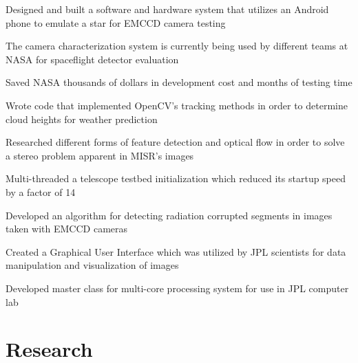 \documentclass[letterpaper]{deedy-resume} %
\begin{document}
\begin{minipage}[t]{0.66\textwidth}
\begin{tightitemize}
	\item 	Designed and built a software and hardware system that utilizes an Android phone to emulate a star for EMCCD camera testing
	\item 	The camera characterization system is currently being used by different teams at NASA for spaceflight detector evaluation 
	\item Saved NASA thousands of dollars in development cost and months of testing time 
\end{tightitemize}
\begin{tightitemize}
	\item  	Wrote code that implemented OpenCV's tracking methods in order to determine cloud heights for weather prediction 
	\item 	Researched different forms of feature detection and optical flow in order to solve a stereo problem apparent in MISR’s images 
\end{tightitemize}
\begin{tightitemize}
	\item 	Multi-threaded a telescope testbed initialization which reduced its startup speed by a factor of 14
	\item 	Developed an algorithm for detecting radiation corrupted segments in images taken with EMCCD cameras 
\end{tightitemize}
\begin{tightitemize}
	\item 	Created a Graphical User Interface which was utilized by JPL scientists for data manipulation and visualization of images 
	\item 	Developed master class for multi-core processing system for use in JPL computer lab 
\end{tightitemize}

\sectionspace %

\section{Research}


\end{minipage}
\end{document}
